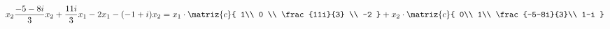 \begin{enumerate}[label=(\alph*)]
$${{              x_2\\
              \frac{-5-8i}{3}x_2 + \frac{11i}{3}x_1 \\
              -2x_1-(-1+i)x_2              
            }
            =
            x_1 \cdot
            \matriz{c}{
              1\\
              0 \\
              \frac{11i}{3} \\
              -2
            }
            +
            x_2 \cdot
            \matriz{c}{
              0\\
              1\\
              \frac{-5-8i}{3}\\
              1-i
            }
          }
        $$

\end{enumerate}

\begin{aportes}
  \item {}
  \item {}
\end{aportes}
